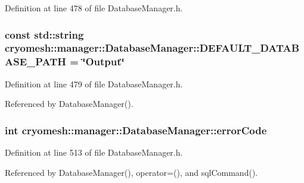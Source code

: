 \-Definition at line 478 of file \-Database\-Manager.\-h.

\hypertarget{classcryomesh_1_1manager_1_1DatabaseManager_add36833b81e7d10423c902929484c70c}{
\subsubsection[{\-D\-E\-F\-A\-U\-L\-T\-\_\-\-D\-A\-T\-A\-B\-A\-S\-E\-\_\-\-P\-A\-T\-H}]{\setlength{\rightskip}{0pt plus 5cm}const std\-::string {\bf cryomesh\-::manager\-::\-Database\-Manager\-::\-D\-E\-F\-A\-U\-L\-T\-\_\-\-D\-A\-T\-A\-B\-A\-S\-E\-\_\-\-P\-A\-T\-H} = \char`\"{}\-Output\char`\"{}}}\label{classcryomesh_1_1manager_1_1DatabaseManager_add36833b81e7d10423c902929484c70c}


\-Definition at line 479 of file \-Database\-Manager.\-h.



\-Referenced by \-Database\-Manager().

\hypertarget{classcryomesh_1_1manager_1_1DatabaseManager_a05a135d69a6712413acd15427ce7e630}{
\subsubsection[{error\-Code}]{\setlength{\rightskip}{0pt plus 5cm}int {\bf cryomesh\-::manager\-::\-Database\-Manager\-::error\-Code}}}\label{classcryomesh_1_1manager_1_1DatabaseManager_a05a135d69a6712413acd15427ce7e630}


\-Definition at line 513 of file \-Database\-Manager.\-h.



\-Referenced by \-Database\-Manager(), operator=(), and sql\-Command().

